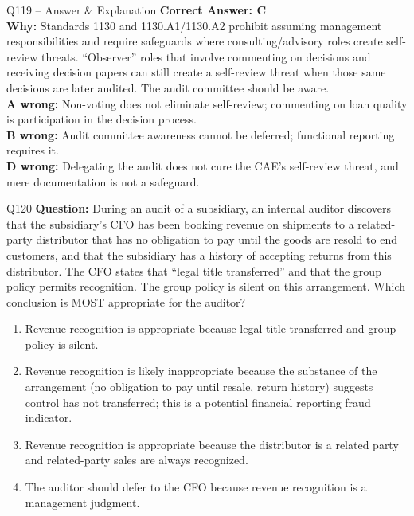 \documentclass[aspectratio=169,10pt]{beamer}
\begin{document}
	\begin{frame}[t]{Q119 -- Answer \& Explanation}
		\small
		\textbf{Correct Answer: C} \\[4pt]
		\textbf{Why:} Standards 1130 and 1130.A1/1130.A2 prohibit assuming management responsibilities and require safeguards where consulting/advisory roles create self-review threats. ``Observer'' roles that involve commenting on decisions and receiving decision papers can still create a self-review threat when those same decisions are later audited. The audit committee should be aware. \\[4pt]
		\textbf{A wrong:} Non-voting does not eliminate self-review; commenting on loan quality is participation in the decision process. \\[2pt]
		\textbf{B wrong:} Audit committee awareness cannot be deferred; functional reporting requires it. \\[2pt]
		\textbf{D wrong:} Delegating the audit does not cure the CAE's self-review threat, and mere documentation is not a safeguard.
	\end{frame}
	
	\begin{frame}[t]{Q120}
		\small
		\textbf{Question:} During an audit of a subsidiary, an internal auditor discovers that the subsidiary's CFO has been booking revenue on shipments to a related-party distributor that has no obligation to pay until the goods are resold to end customers, and that the subsidiary has a history of accepting returns from this distributor. The CFO states that ``legal title transferred'' and that the group policy permits recognition. The group policy is silent on this arrangement. Which conclusion is MOST appropriate for the auditor?
		\begin{enumerate}[label=\Alph*.,itemsep=1pt,topsep=2pt]
			\item Revenue recognition is appropriate because legal title transferred and group policy is silent.
			\item Revenue recognition is likely inappropriate because the substance of the arrangement (no obligation to pay until resale, return history) suggests control has not transferred; this is a potential financial reporting fraud indicator.
			\item Revenue recognition is appropriate because the distributor is a related party and related-party sales are always recognized.
			\item The auditor should defer to the CFO because revenue recognition is a management judgment.
		\end{enumerate}
	\end{frame}
	
\end{document}
